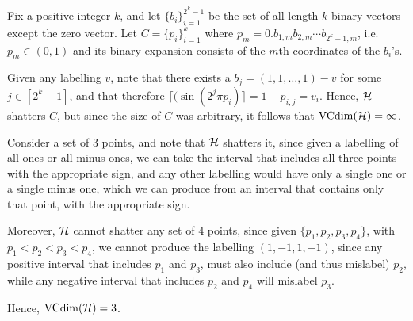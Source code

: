 \begin{ex}
  Fix a positive integer $k$, and let $\{b_i\}_{i=1}^{2^k-1}$ be the set of all
  length $k$ binary vectors except the zero vector. Let $C=\{p_i\}_{i=1}^k$
  where $p_m=0.b_{1,m}b_{2,m}\cdots b_{2^k-1,m}$, i.e.\ $p_m\in(0,1)$ and its
  binary expansion consists of the $m$th coordinates of the $b_i$'s.

  Given any labelling $v$, note that there exists a $b_j=(1,1,\ldots,1)-v$ for
  some $j\in [2^k-1]$, and that therefore
  $\lceil(\sin(2^j\pi p_i) \rceil = 1 - p_{i,j}=v_i$. Hence, $\mathcal{H}$ shatters $C$,
  but since the size of $C$ was arbitrary, it follows that $\operatorname*{VCdim}(\mathcal{H})=\infty$.
\end{ex}

\begin{ex}
  Consider a set of $3$ points, and note that $\mathcal{H}$ shatters it, since given a
  labelling of all ones or all minus ones, we can take the interval that
  includes all three points with the appropriate sign, and any other labelling
  would have only a single one or a single minus one, which we can produce from
  an interval that contains only that point, with the appropriate sign.

  Moreover, $\mathcal{H}$ cannot shatter any set of $4$ points, since given
  $\{p_1,p_2,p_3,p_4\}$, with $p_1<p_2<p_3<p_4$, we cannot produce the labelling
  $(1,-1,1,-1)$, since any positive interval that includes $p_1$ and $p_3$, must
  also include (and thus mislabel) $p_2$, while any negative interval that
  includes $p_2$ and $p_4$ will mislabel $p_3$.

  Hence, $\operatorname*{VCdim}(\mathcal{H})=3$.
\end{ex}

\begin{ex}
\end{ex}

\begin{ex}
\end{ex}

\begin{ex}
\end{ex}